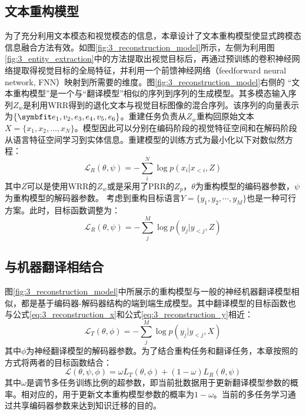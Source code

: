 \subsection{文本重构模型}
\label{sec:3_sentence_reconstruction}

为了充分利用文本模态和视觉模态的信息，本章设计了文本重构模型使显式跨模态信息融合方法有效。如图\ref{fig:3_reconstruction_model}所示，左侧为利用图\ref{fig:3_entity_extraction}中的方法提取出视觉目标后，再通过预训练的卷积神经网络提取得视觉目标的全局特征，并利用一个前馈神经网络（feedforward neural network, FNN）映射到所需要的维度。图\ref{fig:3_reconstruction_model}右侧的 “文本重构模型”是一个与“翻译模型”相似的序列到序列的生成模型。其多模态输入序列$Z_{w}$是利用WRR得到的退化文本与视觉目标图像的混合序列。该序列的向量表示为$\{\Vector{e_1,v_2,e_3,e_4,v_5,e_6}\}$。重建任务负责从$Z_{w}$重构回原始文本$X=\{x_1,x_2,…,x_N\}$。模型因此可以分别在编码阶段的视觉特征空间和在解码阶段从语言特征空间学习到实体信息。重建模型的训练方式为最小化以下对数似然方程：
\begin{equation}
    \mathcal{L}_R(\theta, \psi)=-\sum_i^N \log p(x_i|x_{<i},Z)
    \label{eq:3_reconstruction_x}
\end{equation}
其中$Z$可以是使用WRR的$Z_{w}$或是采用了PRR的$Z_{p}$，$\theta$为重构模型的编码器参数，$\psi$为重构模型的解码器参数。
考虑到重构目标语言$Y=\{y_1,y_2,\cdots,y_M\}$也是一种可行方案。此时，目标函数调整为：
\begin{equation}
    \mathcal{L}_R(\theta, \psi)=-\sum_j^M \log p(y_j|y_{<j},Z)
    \label{eq:3_reconstruction_y}
\end{equation}

\subsection{与机器翻译相结合}
\label{sec:3_multitask}
图\ref{fig:3_reconstruction_model}中所展示的重构模型与一般的神经机器翻译模型相似，都是基于编码器-解码器结构的端到端生成模型。其中翻译模型的目标函数也与公式\ref{eq:3_reconstruction_x}和公式\ref{eq:3_reconstruction_y}相近：
\begin{equation}
    \mathcal{L}_T(\theta, \phi)=-\sum_j^M \log p(y_j|y_{<j},X)
    \label{eq:3_translation}
\end{equation}
其中$\phi$为神经翻译模型的解码器参数。为了结合重构任务和翻译任务，本章按照的方式将两者的目标函数结合：
\begin{equation}
    \mathcal{L}(\theta, \psi, \phi)=\omega L_T(\theta, \phi) + (1-\omega)L_R(\theta, \psi)
    \label{eq:3_combine_sr}
\end{equation}
其中$\omega$是调节多任务训练比例的超参数，即当前批数据用于更新翻译模型参数的概率。相对应的，用于更新文本重构模型参数的概率为$1-\omega$。当前的多任务学习通过共享编码器参数来达到知识迁移的目的。

